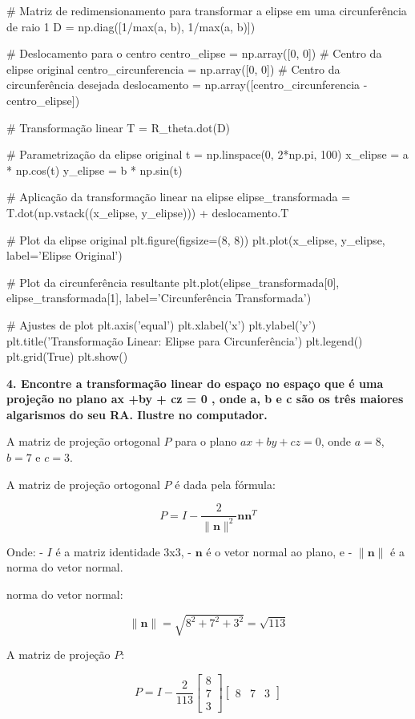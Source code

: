# Matriz de redimensionamento para transformar a elipse em uma circunferência de raio 1
D = np.diag([1/max(a, b), 1/max(a, b)])

# Deslocamento para o centro
centro_elipse = np.array([0, 0])  # Centro da elipse original
centro_circunferencia = np.array([0, 0])  # Centro da circunferência desejada
deslocamento = np.array([centro_circunferencia - centro_elipse])

# Transformação linear
T = R_theta.dot(D)

# Parametrização da elipse original
t = np.linspace(0, 2*np.pi, 100)
x_elipse = a * np.cos(t)
y_elipse = b * np.sin(t)

# Aplicação da transformação linear na elipse
elipse_transformada = T.dot(np.vstack((x_elipse, y_elipse))) + deslocamento.T

# Plot da elipse original
plt.figure(figsize=(8, 8))
plt.plot(x_elipse, y_elipse, label='Elipse Original')

# Plot da circunferência resultante
plt.plot(elipse_transformada[0], elipse_transformada[1], label='Circunferência Transformada')

# Ajustes de plot
plt.axis('equal')
plt.xlabel('x')
plt.ylabel('y')
plt.title('Transformação Linear: Elipse para Circunferência')
plt.legend()
plt.grid(True)
plt.show()



\textbf{4. Encontre a transformação linear do espaço no espaço que é uma projeção no plano ax +by + cz = 0 , onde a, b e c são os três maiores algarismos do seu RA. Ilustre no computador.}

A matriz de projeção ortogonal \( P \) para o plano \( ax + by + cz = 0 \), onde \( a = 8 \), \( b = 7 \) e \( c = 3 \).

A matriz de projeção ortogonal \( P \) é dada pela fórmula:

\[ P = I - \frac{2}{\|\mathbf{n}\|^2} \mathbf{n}\mathbf{n}^T \]

Onde:
- \( I \) é a matriz identidade 3x3,
- \( \mathbf{n} \) é o vetor normal ao plano, e
- \( \|\mathbf{n}\| \) é a norma do vetor normal.

norma do vetor normal:

\[ \| \mathbf{n} \| = \sqrt{8^2 + 7^2 + 3^2} = \sqrt{113} \]

A matriz de projeção \( P \):

\[ P = I - \frac{2}{113} \begin{bmatrix} 8 \\ 7 \\ 3 \end{bmatrix} \begin{bmatrix} 8 & 7 & 3 \end{bmatrix} \]


